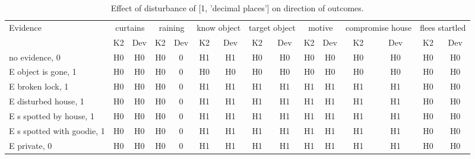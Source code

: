 \begin{table}\begin{tabular}{l|cc|cc|cc|cc|cc|cc|cc}\toprule\multirow{2}{*}{Evidence} & \multicolumn{2}{c}{curtains}& \multicolumn{2}{c}{raining}& \multicolumn{2}{c}{know object}& \multicolumn{2}{c}{target object}& \multicolumn{2}{c}{motive}& \multicolumn{2}{c}{compromise house}& \multicolumn{2}{c}{flees startled}\\& {K2} & {Dev}& {K2} & {Dev}& {K2} & {Dev}& {K2} & {Dev}& {K2} & {Dev}& {K2} & {Dev}& {K2} & {Dev}\\\midrule
no evidence, 0 & H0&H0&\cellcolor{Bittersweet}H0&\cellcolor{Bittersweet}0&H1&H1&H0&H0&H0&H0&H0&H0&H0&H0\\E object is gone, 1 & H0&H0&\cellcolor{Bittersweet}H0&\cellcolor{Bittersweet}0&H0&H0&H0&H0&H0&H0&H0&H0&H0&H0\\E broken lock, 1 & H0&H0&\cellcolor{Bittersweet}H0&\cellcolor{Bittersweet}0&H1&H1&H1&H1&H1&H1&H1&H1&H0&H0\\E disturbed house, 1 & H0&H0&\cellcolor{Bittersweet}H0&\cellcolor{Bittersweet}0&H1&H1&H1&H1&H1&H1&H1&H1&H0&H0\\E s spotted by house, 1 & H0&H0&\cellcolor{Bittersweet}H0&\cellcolor{Bittersweet}0&H1&H1&H1&H1&H1&H1&H1&H1&H0&H0\\E s spotted with goodie, 1 & H0&H0&\cellcolor{Bittersweet}H0&\cellcolor{Bittersweet}0&H1&H1&H1&H1&H1&H1&H1&H1&H0&H0\\E private, 0 & H0&H0&\cellcolor{Bittersweet}H0&\cellcolor{Bittersweet}0&H1&H1&H1&H1&H1&H1&H1&H1&H0&H0\\\bottomrule\end{tabular}\caption{Effect of disturbance of [1, 'decimal places'] on direction of outcomes.}\end{table}